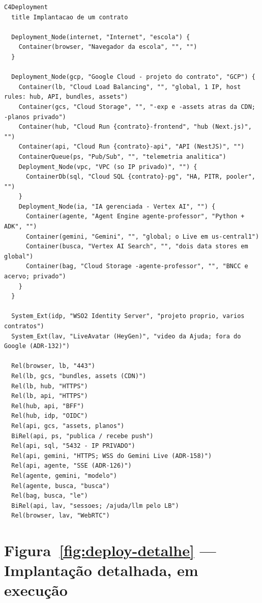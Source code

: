 \begin{lstlisting}[language=mermaid]
C4Deployment
  title Implantacao de um contrato

  Deployment_Node(internet, "Internet", "escola") {
    Container(browser, "Navegador da escola", "", "")
  }

  Deployment_Node(gcp, "Google Cloud - projeto do contrato", "GCP") {
    Container(lb, "Cloud Load Balancing", "", "global, 1 IP, host rules: hub, API, bundles, assets")
    Container(gcs, "Cloud Storage", "", "-exp e -assets atras da CDN; -planos privado")
    Container(hub, "Cloud Run {contrato}-frontend", "hub (Next.js)", "")
    Container(api, "Cloud Run {contrato}-api", "API (NestJS)", "")
    ContainerQueue(ps, "Pub/Sub", "", "telemetria analitica")
    Deployment_Node(vpc, "VPC (so IP privado)", "") {
      ContainerDb(sql, "Cloud SQL {contrato}-pg", "HA, PITR, pooler", "")
    }
    Deployment_Node(ia, "IA gerenciada - Vertex AI", "") {
      Container(agente, "Agent Engine agente-professor", "Python + ADK", "")
      Container(gemini, "Gemini", "", "global; o Live em us-central1")
      Container(busca, "Vertex AI Search", "", "dois data stores em global")
      Container(bag, "Cloud Storage -agente-professor", "", "BNCC e acervo; privado")
    }
  }

  System_Ext(idp, "WSO2 Identity Server", "projeto proprio, varios contratos")
  System_Ext(lav, "LiveAvatar (HeyGen)", "video da Ajuda; fora do Google (ADR-132)")

  Rel(browser, lb, "443")
  Rel(lb, gcs, "bundles, assets (CDN)")
  Rel(lb, hub, "HTTPS")
  Rel(lb, api, "HTTPS")
  Rel(hub, api, "BFF")
  Rel(hub, idp, "OIDC")
  Rel(api, gcs, "assets, planos")
  BiRel(api, ps, "publica / recebe push")
  Rel(api, sql, "5432 - IP PRIVADO")
  Rel(api, gemini, "HTTPS; WSS do Gemini Live (ADR-158)")
  Rel(api, agente, "SSE (ADR-126)")
  Rel(agente, gemini, "modelo")
  Rel(agente, busca, "busca")
  Rel(bag, busca, "le")
  BiRel(api, lav, "sessoes; /ajuda/llm pelo LB")
  Rel(browser, lav, "WebRTC")
\end{lstlisting}

\section{Figura~\ref{fig:deploy-detalhe} --- Implantação detalhada, em execução}

